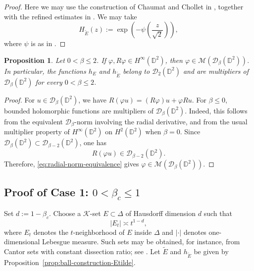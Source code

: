 \documentclass[a4paper,12pt]{amsart}
\newtheorem{prop}[thm]{Proposition}
\theoremstyle{definition}
\begin{document}
\begin{proof}
Here we may use the construction of Chaumat and Chollet in
\cite[Proposition~17]{Chaumat_Chollet_Hausdorff}, together with the refined
estimates in \cite[Proposition~27]{Pouriya_CriticalBall}. We may take
\[
    H_{\widetilde E}(z)
    :=\exp\left(-\psi\left(\frac{z}{\sqrt{2}}\right)\right),
\]
where $\psi$ is as in \cite[Proposition~27]{Pouriya_CriticalBall}.

\end{proof}

\begin{prop}\label{prop:ball-restrictions-multipliers}
Let $0<\beta\leq2$. If $\varphi,R\varphi\in
H^\infty(\mathbb D^2)$, then
$
    \varphi\in\mathcal M(\mathcal D_\beta(\mathbb D^2)).
$
In particular, the functions $h_E$ and $h_{\widetilde E}$ belong to
$\mathcal D_2(\mathbb D^2)$ and are multipliers of $\mathcal D_\beta(\mathbb D^2)$ for
every $0<\beta\leq2$.
\end{prop}

\begin{proof}
For $u\in \mathcal D_\beta(\mathbb D^2)$, we have
$
    R(\varphi u)=(R\varphi)u+\varphi Ru.
$
For $\beta\leq0$, bounded holomorphic functions are multipliers of
$\mathcal D_\beta(\mathbb D^2)$. Indeed, this follows from the equivalent $\mathcal D_{\beta}$-norm involving the radial derivative, and from the
usual multiplier property of $H^\infty(\mathbb D^2)$ on
$H^2(\mathbb D^2)$ when $\beta=0$. Since
$\mathcal D_\beta(\mathbb D^2)\subset \mathcal D_{\beta-2}(\mathbb D^2)$, one has
\[
    R(\varphi u)\in \mathcal D_{\beta-2}(\mathbb D^2).
\]
Therefore, \eqref{eq:radial-norm-equivalence} gives
$\varphi\in\mathcal M(\mathcal D_\beta(\mathbb D^2))$.
\end{proof}

\subsection{Proof of Case 1:
\texorpdfstring{$0<\beta_c\leq1$}{0 < beta\_c <= 1}}
Set $d:=1-\beta_c$. Choose a $\mathcal K$-set
$E\subset\Delta$ of Hausdorff dimension $d$ such that
\begin{equation}
    |E_t|\asymp t^{1-d},
    \label{eq:case1-neighborhood-growth}
\end{equation}
where $E_t$ denotes the $t$-neighborhood of $E$ inside $\Delta$ and
$|\cdot|$ denotes one-dimensional Lebesgue measure. Such sets may be
obtained, for instance, from Cantor sets with constant dissection
ratio; see \cite{ELFALLAH2010_Cantor}. Let
$\widetilde E$ and
$h_{\widetilde E}$ be given by
Proposition~\ref{prop:ball-construction-Etilde}.
\end{document}
